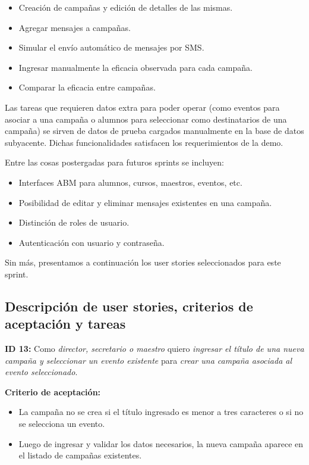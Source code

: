 \documentclass[a4paper, 10pt, twoside]{article}
\newcommand{\sprintstory}[4]{
  \noindent
  \textbf{ID #1:} Como \emph{#2} quiero \emph{#3} para \emph{#4}.
}
\newenvironment{criterios}{
  \textbf{Criterio de aceptación:}
  \begin{itemize}
}{
  \end{itemize}
}
\newcommand{\criterio}[1] {
  \item #1
}
\begin{document}
\begin{itemize}
  \item Creación de campañas y edición de detalles de las mismas.
  \item Agregar mensajes a campañas.
  \item Simular el envío automático de mensajes por SMS.
  \item Ingresar manualmente la eficacia observada para cada campaña.
  \item Comparar la eficacia entre campañas.
\end{itemize}

Las tareas que requieren datos extra para poder operar (como eventos para asociar a una campaña o alumnos para seleccionar como destinatarios de una campaña) se sirven de datos de prueba cargados manualmente en la base de datos subyacente. Dichas funcionalidades satisfacen los requerimientos de la demo.

Entre las cosas postergadas para futuros sprints se incluyen:

\begin{itemize}
  \item Interfaces ABM para alumnos, cursos, maestros, eventos, etc.
  \item Posibilidad de editar y eliminar mensajes existentes en una campaña.
  \item Distinción de roles de usuario.
  \item Autenticación con usuario y contraseña.
\end{itemize}

Sin más, presentamos a continuación los user stories seleccionados para este sprint.


\subsection{Descripción de user stories, criterios de aceptación y tareas}

\sprintstory{13}
            {director, secretario o maestro}
            {ingresar el título de una nueva campaña y seleccionar un evento existente}
            {crear una campaña asociada al evento seleccionado}

\begin{criterios}
  \criterio{La campaña no se crea si el título ingresado es menor a tres caracteres o si no se selecciona un evento.}
  \criterio{Luego de ingresar y validar los datos necesarios, la nueva campaña aparece en el listado de campañas existentes.}
\end{criterios}
\end{document}
